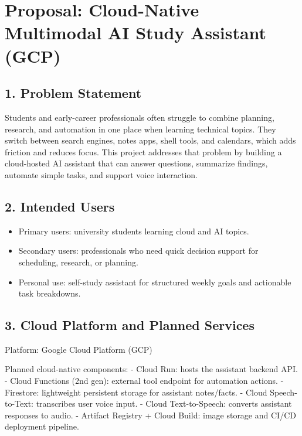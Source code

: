 \documentclass[
]{article}
\author{}
\date{}
\providecommand{\tightlist}{%
  \setlength{\itemsep}{0pt}\setlength{\parskip}{0pt}}
\begin{document}
\section{Proposal: Cloud-Native Multimodal AI Study Assistant
(GCP)}\label{proposal-cloud-native-multimodal-ai-study-assistant-gcp}

\subsection{1. Problem Statement}\label{problem-statement}

Students and early-career professionals often struggle to combine
planning, research, and automation in one place when learning technical
topics. They switch between search engines, notes apps, shell tools, and
calendars, which adds friction and reduces focus. This project addresses
that problem by building a cloud-hosted AI assistant that can answer
questions, summarize findings, automate simple tasks, and support voice
interaction.

\subsection{2. Intended Users}\label{intended-users}

\begin{itemize}
\tightlist
\item
  Primary users: university students learning cloud and AI topics.
\item
  Secondary users: professionals who need quick decision support for
  scheduling, research, or planning.
\item
  Personal use: self-study assistant for structured weekly goals and
  actionable task breakdowns.
\end{itemize}

\subsection{3. Cloud Platform and Planned
Services}\label{cloud-platform-and-planned-services}

Platform: Google Cloud Platform (GCP)

Planned cloud-native components: - Cloud Run: hosts the assistant
backend API. - Cloud Functions (2nd gen): external tool endpoint for
automation actions. - Firestore: lightweight persistent storage for
assistant notes/facts. - Cloud Speech-to-Text: transcribes user voice
input. - Cloud Text-to-Speech: converts assistant responses to audio. -
Artifact Registry + Cloud Build: image storage and CI/CD deployment
pipeline.
\end{document}
